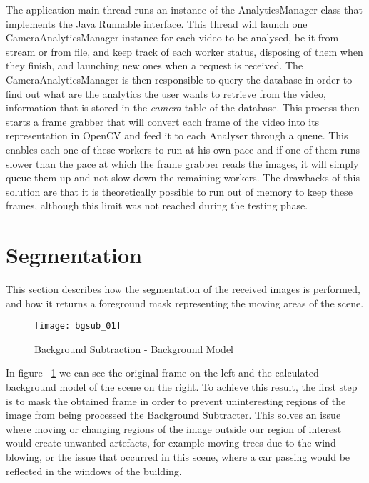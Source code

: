 The application main thread runs an instance of the AnalyticsManager class that implements the Java Runnable interface. This thread will launch one CameraAnalyticsManager instance for each video to be analysed, be it from stream or from file, and keep track of each worker status, disposing of them when they finish, and launching new ones when a request is received. The CameraAnalyticsManager is then responsible to query the database in order to find out what are the analytics the user wants to retrieve from the video, information that is stored in the \textit{camera} table of the database. This process then starts a frame grabber that will convert each frame of the video into its representation in OpenCV and feed it to each Analyser through a queue. This enables each one of these workers to run at his own pace and if one of them runs slower than the pace at which the frame grabber reads the images, it will simply queue them up and not slow down the remaining workers. The drawbacks of this solution are that it is theoretically possible to run out of memory to keep these frames, although this limit was not reached during the testing phase.

\section{Segmentation}

This section describes how the segmentation of the received images is performed, and how it returns a foreground mask representing the moving areas of the scene. 

\begin{figure}[h]
  \begin{center}
    \leavevmode
    \texttt{[image: bgsub\_01]}
    \caption{Background Subtraction - Background Model}
    \label{fig:bgsub_01}
  \end{center}
\end{figure}

In figure ~\ref{fig:bgsub_01} we can see the original frame on the left and the calculated background model of the scene on the right. To achieve this result, the first step is to mask the obtained frame  in order to prevent uninteresting regions of the image from being processed the Background Subtracter. This solves an issue where moving or changing regions of the image outside our region of interest would create unwanted artefacts, for example moving trees due to the wind blowing, or the issue that occurred in this scene, where a car passing would be reflected in the windows of the building.


